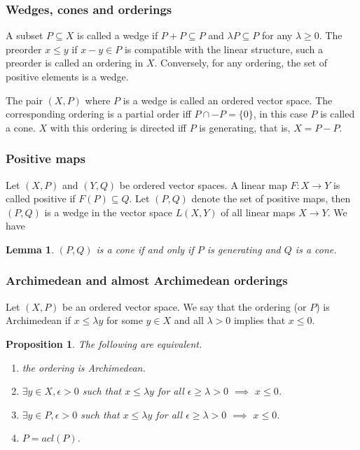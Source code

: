 \documentclass[12pt]{article}
\newtheorem{lemma}{Lemma}
\newtheorem{prop}{Proposition}
\theoremstyle{remark}
\newcommand{\<}{\langle}
\begin{document}

\subsubsection*{Wedges, cones and orderings}

A subset $P\subseteq X$ is called a  wedge if $P+P\subseteq P$ and $\lambda P\subseteq P$ for any $\lambda\ge 0$. The preorder $x\le y$ if $x-y\in P$ is compatible with the linear structure, such a preorder is called an ordering in $X$. Conversely, for any ordering, the set of positive elements  is a wedge.

The pair $(X,P)$ where $P$ is a wedge is called an ordered vector space. 
The corresponding ordering is a partial order iff $P\cap -P=\{0\}$, in this case $P$ is called a cone. 
$X$ with this ordering is directed  iff $P$ is generating, that is,  $X=P-P$. 

\subsubsection*{Positive maps}

Let $(X,P)$ and $(Y,Q)$ be ordered vector spaces. A  linear map $F:X\to Y$ is called positive if $F(P)\subseteq Q$.
 Let  $(P,Q)$ denote the set of positive maps, then $(P,Q)$ is a wedge in the vector space $L(X,Y)$ of all linear maps $X\to Y$. We have

\begin{lemma}\label{lemma:duality_morph} $(P,Q)$ is a cone if and only if $P$ is generating and $Q$ is a cone.

\end{lemma}

\subsubsection*{Archimedean and almost Archimedean orderings}

Let $(X,P)$ be an ordered vector space. We say that the ordering (or $P$) is Archimedean if 
 $x\le \lambda y$ for some $y\in X$ and all $\lambda> 0$ implies that $x\le 0$. 
\begin{prop}
The following are equivalent.
\begin{enumerate}
\item[(i)] the ordering is Archimedean.
\item[(ii)]  $\exists y\in X, \epsilon >0$ such that  $x\le \lambda y$ for all $\epsilon\ge \lambda>0$ $\implies$ $x\le 0$.
\item[(iii)] $\exists y\in P, \epsilon >0$ such that  $x\le \lambda y$ for all $\epsilon\ge \lambda>0$ $\implies$ $x\le 0$.
\item[(iv)] $P=acl(P)$.
\end{enumerate}
\end{prop}
\end{document}
